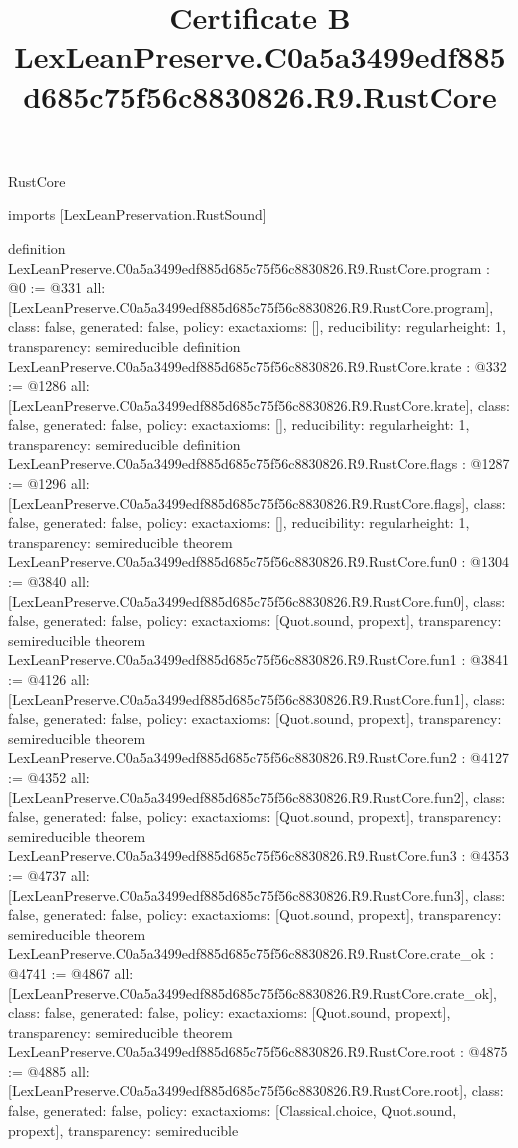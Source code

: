 \begin{lexlean}{RustCore}
\title{Certificate B LexLeanPreserve.C0a5a3499edf885d685c75f56c8830826.R9.RustCore}
\begin{coremodule}
imports [LexLeanPreservation.RustSound]

definition LexLeanPreserve.C0a5a3499edf885d685c75f56c8830826.R9.RustCore.program : @0 := @331 {
  all: [LexLeanPreserve.C0a5a3499edf885d685c75f56c8830826.R9.RustCore.program],
  class: false,
  generated: false,
  policy: exact{axioms: []},
  reducibility: regular{height: 1},
  transparency: semireducible
}
definition LexLeanPreserve.C0a5a3499edf885d685c75f56c8830826.R9.RustCore.krate : @332 := @1286 {
  all: [LexLeanPreserve.C0a5a3499edf885d685c75f56c8830826.R9.RustCore.krate],
  class: false,
  generated: false,
  policy: exact{axioms: []},
  reducibility: regular{height: 1},
  transparency: semireducible
}
definition LexLeanPreserve.C0a5a3499edf885d685c75f56c8830826.R9.RustCore.flags : @1287 := @1296 {
  all: [LexLeanPreserve.C0a5a3499edf885d685c75f56c8830826.R9.RustCore.flags],
  class: false,
  generated: false,
  policy: exact{axioms: []},
  reducibility: regular{height: 1},
  transparency: semireducible
}
theorem LexLeanPreserve.C0a5a3499edf885d685c75f56c8830826.R9.RustCore.fun0 : @1304 := @3840 {
  all: [LexLeanPreserve.C0a5a3499edf885d685c75f56c8830826.R9.RustCore.fun0],
  class: false,
  generated: false,
  policy: exact{axioms: [Quot.sound, propext]},
  transparency: semireducible
}
theorem LexLeanPreserve.C0a5a3499edf885d685c75f56c8830826.R9.RustCore.fun1 : @3841 := @4126 {
  all: [LexLeanPreserve.C0a5a3499edf885d685c75f56c8830826.R9.RustCore.fun1],
  class: false,
  generated: false,
  policy: exact{axioms: [Quot.sound, propext]},
  transparency: semireducible
}
theorem LexLeanPreserve.C0a5a3499edf885d685c75f56c8830826.R9.RustCore.fun2 : @4127 := @4352 {
  all: [LexLeanPreserve.C0a5a3499edf885d685c75f56c8830826.R9.RustCore.fun2],
  class: false,
  generated: false,
  policy: exact{axioms: [Quot.sound, propext]},
  transparency: semireducible
}
theorem LexLeanPreserve.C0a5a3499edf885d685c75f56c8830826.R9.RustCore.fun3 : @4353 := @4737 {
  all: [LexLeanPreserve.C0a5a3499edf885d685c75f56c8830826.R9.RustCore.fun3],
  class: false,
  generated: false,
  policy: exact{axioms: [Quot.sound, propext]},
  transparency: semireducible
}
theorem LexLeanPreserve.C0a5a3499edf885d685c75f56c8830826.R9.RustCore.crate_ok : @4741 := @4867 {
  all: [LexLeanPreserve.C0a5a3499edf885d685c75f56c8830826.R9.RustCore.crate_ok],
  class: false,
  generated: false,
  policy: exact{axioms: [Quot.sound, propext]},
  transparency: semireducible
}
theorem LexLeanPreserve.C0a5a3499edf885d685c75f56c8830826.R9.RustCore.root : @4875 := @4885 {
  all: [LexLeanPreserve.C0a5a3499edf885d685c75f56c8830826.R9.RustCore.root],
  class: false,
  generated: false,
  policy: exact{axioms: [Classical.choice, Quot.sound, propext]},
  transparency: semireducible
}


\end{coremodule}
\end{lexlean}
